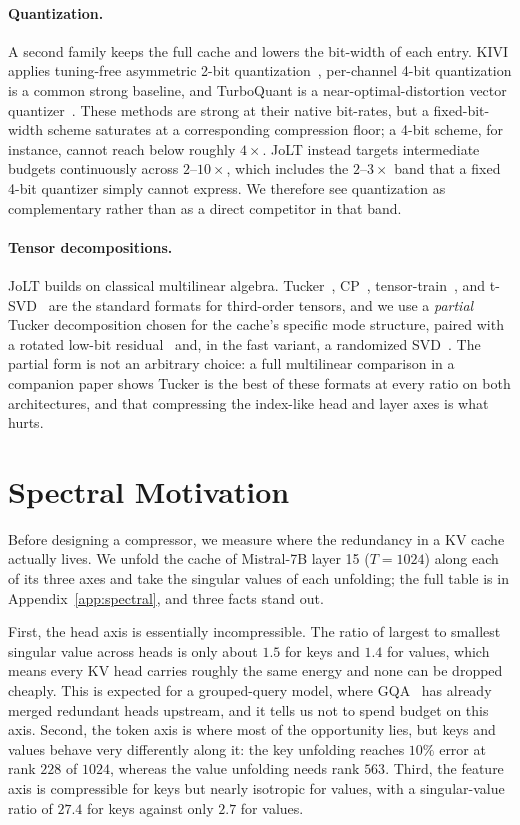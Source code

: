 \documentclass{article}
\begin{document}
\paragraph{Quantization.} A second family keeps the full cache and lowers the bit-width of each entry. KIVI applies tuning-free asymmetric 2-bit quantization~\citep{liu2024kivi}, per-channel 4-bit quantization is a common strong baseline, and TurboQuant is a near-optimal-distortion vector quantizer~\citep{turboquant2025}. These methods are strong at their native bit-rates, but a fixed-bit-width scheme saturates at a corresponding compression floor; a 4-bit scheme, for instance, cannot reach below roughly $4\times$. JoLT instead targets intermediate budgets continuously across $2$--$10\times$, which includes the $2$--$3\times$ band that a fixed 4-bit quantizer simply cannot express. We therefore see quantization as complementary rather than as a direct competitor in that band.

\paragraph{Tensor decompositions.} JoLT builds on classical multilinear algebra. Tucker~\citep{tucker1966some,delathauwer2000hosvd}, CP~\citep{kolda2009tensor}, tensor-train~\citep{oseledets2011tt}, and t-SVD~\citep{kilmer2011tsvd} are the standard formats for third-order tensors, and we use a \emph{partial} Tucker decomposition chosen for the cache's specific mode structure, paired with a rotated low-bit residual~\citep{ashkboos2024quarot,liu2025spinquant} and, in the fast variant, a randomized SVD~\citep{halko2011randomized}. The partial form is not an arbitrary choice: a full multilinear comparison in a companion paper shows Tucker is the best of these formats at every ratio on both architectures, and that compressing the index-like head and layer axes is what hurts.

\section{Spectral Motivation}
\label{sec:spectral}
Before designing a compressor, we measure where the redundancy in a KV cache actually lives. We unfold the cache of Mistral-7B layer 15 ($T{=}1024$) along each of its three axes and take the singular values of each unfolding; the full table is in Appendix~\ref{app:spectral}, and three facts stand out.

First, the head axis is essentially incompressible. The ratio of largest to smallest singular value across heads is only about $1.5$ for keys and $1.4$ for values, which means every KV head carries roughly the same energy and none can be dropped cheaply. This is expected for a grouped-query model, where GQA~\citep{ainslie2023gqa} has already merged redundant heads upstream, and it tells us not to spend budget on this axis. Second, the token axis is where most of the opportunity lies, but keys and values behave very differently along it: the key unfolding reaches $10\%$ error at rank $228$ of $1024$, whereas the value unfolding needs rank $563$. Third, the feature axis is compressible for keys but nearly isotropic for values, with a singular-value ratio of $27.4$ for keys against only $2.7$ for values.
\end{document}
